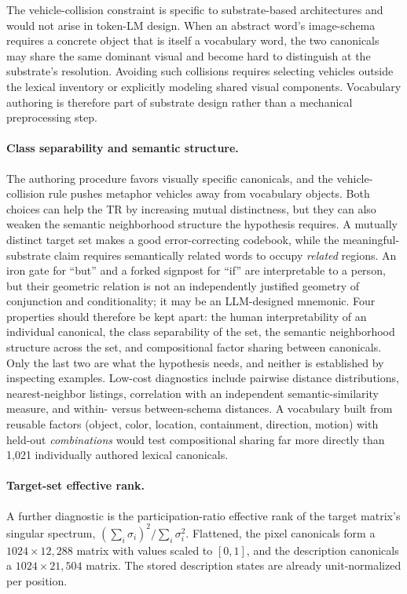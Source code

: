 \documentclass[11pt,a4paper]{article}
\begin{document}
The vehicle-collision constraint is specific to substrate-based architectures and would not arise in token-LM design. When an abstract word's image-schema requires a concrete object that is itself a vocabulary word, the two canonicals may share the same dominant visual and become hard to distinguish at the substrate's resolution. Avoiding such collisions requires selecting vehicles outside the lexical inventory or explicitly modeling shared visual components. Vocabulary authoring is therefore part of substrate design rather than a mechanical preprocessing step.

\paragraph{Class separability and semantic structure.} The authoring procedure favors visually specific canonicals, and the vehicle-collision rule pushes metaphor vehicles away from vocabulary objects. Both choices can help the TR by increasing mutual distinctness, but they can also weaken the semantic neighborhood structure the hypothesis requires. A mutually distinct target set makes a good error-correcting codebook, while the meaningful-substrate claim requires semantically related words to occupy \emph{related} regions. An iron gate for ``but'' and a forked signpost for ``if'' are interpretable to a person, but their geometric relation is not an independently justified geometry of conjunction and conditionality; it may be an LLM-designed mnemonic. Four properties should therefore be kept apart: the human interpretability of an individual canonical, the class separability of the set, the semantic neighborhood structure across the set, and compositional factor sharing between canonicals. Only the last two are what the hypothesis needs, and neither is established by inspecting examples. Low-cost diagnostics include pairwise distance distributions, nearest-neighbor listings, correlation with an independent semantic-similarity measure, and within- versus between-schema distances. A vocabulary built from reusable factors (object, color, location, containment, direction, motion) with held-out \emph{combinations} would test compositional sharing far more directly than 1,021 individually authored lexical canonicals.

\paragraph{Target-set effective rank.} A further diagnostic is the participation-ratio effective rank of the target matrix's singular spectrum, $\left(\sum_i \sigma_i\right)^2 / \sum_i \sigma_i^2$. Flattened, the pixel canonicals form a $1024 \times 12{,}288$ matrix with values scaled to $[0,1]$, and the description canonicals a $1024 \times 21{,}504$ matrix. The stored description states are already unit-normalized per position.
\end{document}
